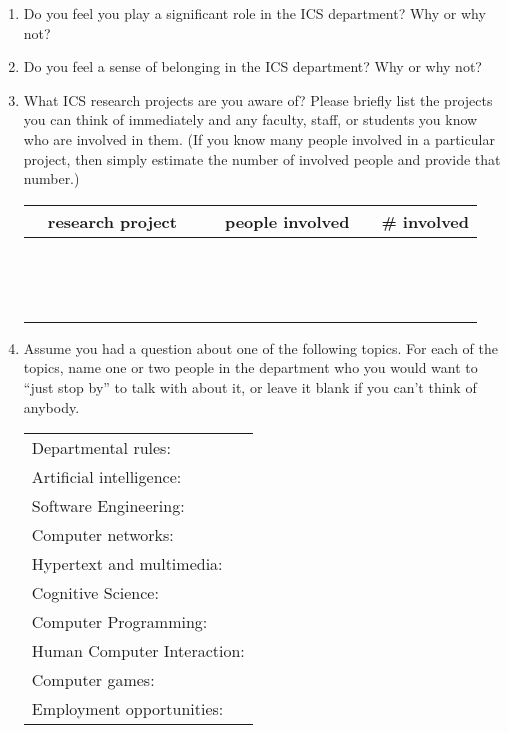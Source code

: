 \begin{enumerate}
\item{Do you feel you play a significant role in the ICS department?  Why
  or why not?}
\\ 

\item{Do you feel a sense of belonging in the ICS department?  Why or why not?}
\\ 

\item{What ICS research projects are you aware of?  Please briefly list the
  projects you can think of immediately and any faculty, staff, or students
  you know who are involved in them. (If you know many people involved in a
  particular project, then simply estimate the number of involved people
  and provide that number.)}\\
  \begin{tabular}{ccc|ccc|c}
    & research project & & &  people involved    & & \# involved    \\ \hline
    &&&&&&\\ &&&&&&\\ &&&&&&\\ &&&&&&\\ &&&&&&\\ &&&&&&\\ &&&&&&\\ &&&&&&\\
    &&&&&&\\ &&&&&&\\ &&&&&&\\ &&&&&&\\ &&&&&&\\ &&&&&&\\
  \end{tabular}

\item{Assume you had a question about one of the following topics.  For
  each of the topics, name one or two people in the department who you
  would want to ``just stop by'' to talk with about it, or leave it blank
  if you can't think of anybody.}\\
  \begin{tabular}{l}
  Departmental rules: \\
  Artificial intelligence: \\
  Software Engineering: \\
  Computer networks: \\
  Hypertext and multimedia: \\
  Cognitive Science: \\
  Computer Programming: \\
  Human Computer Interaction: \\
  Computer games: \\
  Employment opportunities: \\
  \end{tabular}


\end{enumerate}
